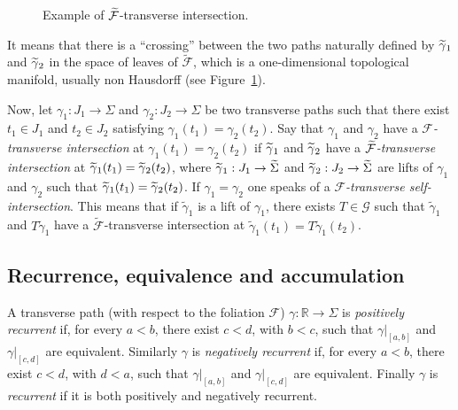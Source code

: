\documentclass[10pt,a4paper]{article}
\theoremstyle{definition}
\theoremstyle{plain}
\numberwithin{equation}{section}
\numberwithin{figure}{section}
\newcommand{\R}{\mathbb{R}}
\newcommand{\G}{\mathcal{G}}
\newcommand{\F}{\mathcal{F}}
\let\oldtilde\tilde
\renewcommand*{\tilde}[1]{\mathchoice{\widetilde{#1}}{\widetilde{#1}}{\oldtilde{#1}}{\oldtilde{#1}}}
\begin{document}
\begin{figure}
\begin{center}

\caption{Example of $\tilde{\F}$-transverse intersection.\label{Fig:extransverse}
}
\end{center}
\end{figure}

It means that there is a ``crossing'' between the two paths naturally defined by $\tilde\gamma_1$ and $\tilde\gamma_2$ in the space of leaves of $\widetilde{\F}$, which is a one-dimensional topological manifold, usually non Hausdorff (see Figure~\ref{Fig:extransverse}).


Now, let $\gamma_1:J_1\to \Sigma$ and $\gamma_2:J_2\to \Sigma$ be two transverse paths such that there exist $t_1\in J_1$ and $t_2\in J_2$ satisfying $\gamma_1(t_1)=\gamma_2(t_2)$. Say that $\gamma_1$ and $\gamma_2$ have a \emph{${\F}$-transverse intersection} at $\gamma_1(t_1)=\gamma_2(t_2)$ if $\tilde\gamma_1$ and $\tilde\gamma_2$ have a \emph{${\tilde{\F}}$-transverse intersection} at $\tilde\gamma_1(t_1)=\tilde\gamma_2(t_2)$, where $\tilde\gamma_1:J_1\to \tilde \Sigma$ and $\tilde\gamma_2:J_2\to \tilde \Sigma$ are lifts of $\gamma_1$ and $\gamma_2$ such that $\tilde\gamma_1(t_1)=\tilde\gamma_2(t_2)$. If $\gamma_1=\gamma_2$ one speaks of a \emph{$\F$-transverse self-intersection}. This means that if $\widetilde \gamma_1$ is a lift of $\gamma_1$, there exists $T\in\G$ such that $\widetilde\gamma_1$ and $T\widetilde\gamma_1$ have a $\widetilde{\F}$-transverse intersection at $\widetilde\gamma_1(t_1)=T\widetilde\gamma_1(t_2)$.



\subsection{Recurrence, equivalence and accumulation} A transverse path (with respect to the foliation $\F$) $\gamma:\R\to \Sigma$ is \emph{positively recurrent} if, for every $a<b$, there exist $c<d$, with $b<c$, such that $\gamma|_{[a,b]}$ and $\gamma|_{[c,d]}$ are equivalent. Similarly $\gamma$ is \emph{negatively recurrent} if, for every $a<b$, there exist $c<d$, with $d<a$, such that $\gamma|_{[a,b]}$ and $\gamma|_{[c,d]}$ are equivalent. Finally $\gamma$ is \emph{recurrent} if it is both positively and negatively recurrent.
\end{document}
